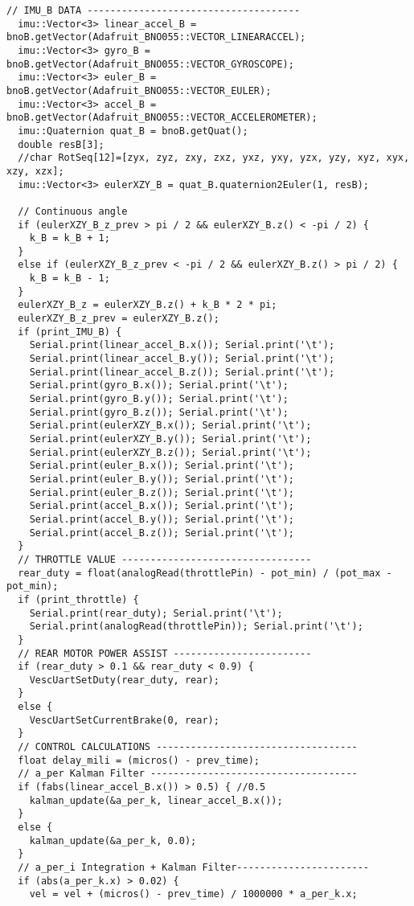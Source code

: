 \begin{lstlisting}[style=codearduino]
  // IMU_B DATA -------------------------------------
  imu::Vector<3> linear_accel_B = bnoB.getVector(Adafruit_BNO055::VECTOR_LINEARACCEL);
  imu::Vector<3> gyro_B = bnoB.getVector(Adafruit_BNO055::VECTOR_GYROSCOPE);
  imu::Vector<3> euler_B = bnoB.getVector(Adafruit_BNO055::VECTOR_EULER);
  imu::Vector<3> accel_B = bnoB.getVector(Adafruit_BNO055::VECTOR_ACCELEROMETER);
  imu::Quaternion quat_B = bnoB.getQuat();
  double resB[3];
  //char RotSeq[12]=[zyx, zyz, zxy, zxz, yxz, yxy, yzx, yzy, xyz, xyx, xzy, xzx];
  imu::Vector<3> eulerXZY_B = quat_B.quaternion2Euler(1, resB);

  // Continuous angle
  if (eulerXZY_B_z_prev > pi / 2 && eulerXZY_B.z() < -pi / 2) {
    k_B = k_B + 1;
  }
  else if (eulerXZY_B_z_prev < -pi / 2 && eulerXZY_B.z() > pi / 2) {
    k_B = k_B - 1;
  }
  eulerXZY_B_z = eulerXZY_B.z() + k_B * 2 * pi;
  eulerXZY_B_z_prev = eulerXZY_B.z();
  if (print_IMU_B) {
    Serial.print(linear_accel_B.x()); Serial.print('\t');
    Serial.print(linear_accel_B.y()); Serial.print('\t');
    Serial.print(linear_accel_B.z()); Serial.print('\t');
    Serial.print(gyro_B.x()); Serial.print('\t');
    Serial.print(gyro_B.y()); Serial.print('\t');
    Serial.print(gyro_B.z()); Serial.print('\t');
    Serial.print(eulerXZY_B.x()); Serial.print('\t');
    Serial.print(eulerXZY_B.y()); Serial.print('\t');
    Serial.print(eulerXZY_B.z()); Serial.print('\t');
    Serial.print(euler_B.x()); Serial.print('\t');
    Serial.print(euler_B.y()); Serial.print('\t');
    Serial.print(euler_B.z()); Serial.print('\t');
    Serial.print(accel_B.x()); Serial.print('\t');
    Serial.print(accel_B.y()); Serial.print('\t');
    Serial.print(accel_B.z()); Serial.print('\t');
  }
  // THROTTLE VALUE ---------------------------------
  rear_duty = float(analogRead(throttlePin) - pot_min) / (pot_max - pot_min);
  if (print_throttle) {
    Serial.print(rear_duty); Serial.print('\t');
    Serial.print(analogRead(throttlePin)); Serial.print('\t');
  }
  // REAR MOTOR POWER ASSIST ------------------------
  if (rear_duty > 0.1 && rear_duty < 0.9) {
    VescUartSetDuty(rear_duty, rear);
  }
  else {
    VescUartSetCurrentBrake(0, rear);
  }
  // CONTROL CALCULATIONS -----------------------------------
  float delay_mili = (micros() - prev_time);
  // a_per Kalman Filter ------------------------------------
  if (fabs(linear_accel_B.x()) > 0.5) { //0.5
    kalman_update(&a_per_k, linear_accel_B.x());
  }
  else {
    kalman_update(&a_per_k, 0.0);
  }
  // a_per_i Integration + Kalman Filter-----------------------
  if (abs(a_per_k.x) > 0.02) {
    vel = vel + (micros() - prev_time) / 1000000 * a_per_k.x;

\end{lstlisting}
